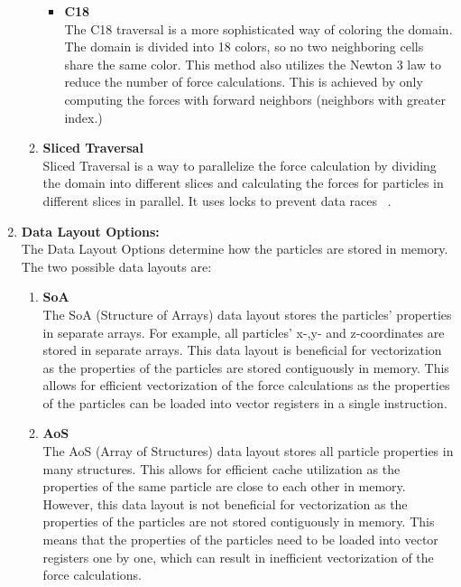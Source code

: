 \begin{enumerate}[label=\textbf{\arabic*.}]
\begin{enumerate}
\begin{itemize}
                              \item \textbf{C18} \\
                                    The C18 traversal is a more sophisticated way of coloring the domain. The domain is divided into 18 colors, so no two neighboring cells share the same color. This method also utilizes the Newton 3 law to reduce the number of force calculations. This is achieved by only computing the forces with forward neighbors (neighbors with greater index.) ~\cite{GRATL2022108262}

                        \end{itemize}

                  \item \textbf{Sliced Traversal} \\
                        Sliced Traversal is a way to parallelize the force calculation by dividing the domain into different slices and calculating the forces for particles in different slices in parallel. It uses locks to prevent data races ~\cite{GRATL2022108262}.

            \end{enumerate}


      \item \textbf{Data Layout Options:} \\
            The Data Layout Options determine how the particles are stored in memory. The two possible data layouts are:
            \begin{enumerate}
                  \item \textbf{SoA} \\
                        The SoA (Structure of Arrays) data layout stores the particles' properties in separate arrays. For example, all particles' x-,y- and z-coordinates are stored in separate arrays. This data layout is beneficial for vectorization as the properties of the particles are stored contiguously in memory. This allows for efficient vectorization of the force calculations as the properties of the particles can be loaded into vector registers in a single instruction. 

                  \item \textbf{AoS} \\
                        The AoS (Array of Structures) data layout stores all particle properties in many structures. This allows for efficient cache utilization as the properties of the same particle are close to each other in memory. However, this data layout is not beneficial for vectorization as the properties of the particles are not stored contiguously in memory. This means that the properties of the particles need to be loaded into vector registers one by one, which can result in inefficient vectorization of the force calculations. 
            \end{enumerate}




\end{enumerate}
